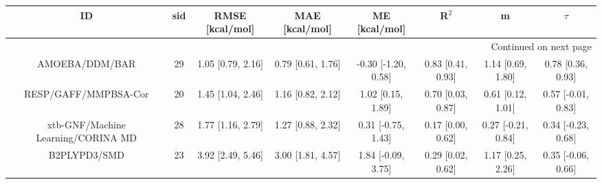 \documentclass[8pt]{article}
\begin{document}
\begin{center}
\begin{footnotesize}
\begin{longtable}{|cccccccc|}
\toprule
                                 ID & sid &    RMSE [kcal/mol] &     MAE [kcal/mol] &        ME [kcal/mol] &              R$^2$ &                   m &              $\tau$ \\
\midrule
\endhead
\midrule
\multicolumn{8}{r}{{Continued on next page}} \\
\midrule
\endfoot

\bottomrule
\endlastfoot
                     AMOEBA/DDM/BAR &  29 &  1.05 [0.79, 2.16] &  0.79 [0.61, 1.76] &  -0.30 [-1.20, 0.58] &  0.83 [0.41, 0.93] &   1.14 [0.69, 1.80] &   0.78 [0.36, 0.93] \\
               RESP/GAFF/MMPBSA-Cor &  20 &  1.45 [1.04, 2.46] &  1.16 [0.82, 2.12] &    1.02 [0.15, 1.89] &  0.70 [0.03, 0.87] &   0.61 [0.12, 1.01] &  0.57 [-0.01, 0.83] \\
 xtb-GNF/Machine Learning/CORINA MD &  28 &  1.77 [1.16, 2.79] &  1.27 [0.88, 2.32] &   0.31 [-0.75, 1.43] &  0.17 [0.00, 0.62] &  0.27 [-0.21, 0.84] &  0.34 [-0.23, 0.68] \\
                       B2PLYPD3/SMD &  23 &  3.92 [2.49, 5.46] &  3.00 [1.81, 4.57] &   1.84 [-0.09, 3.75] &  0.29 [0.02, 0.62] &   1.17 [0.25, 2.26] &  0.35 [-0.06, 0.66] \\
\end{longtable}
\end{footnotesize}
\end{center}
\end{document}
